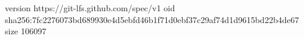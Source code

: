 version https://git-lfs.github.com/spec/v1
oid sha256:7fc2276073bd689930e4d5ebfd46b1f71d0ebf37c29af74d1d9615bd22b4de67
size 106097
